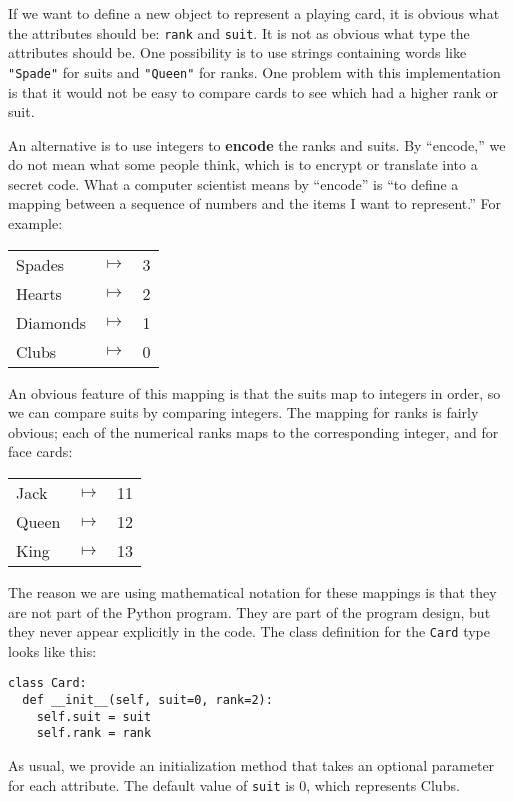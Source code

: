 
If we want to define a new object to represent a playing card, it is
obvious what the attributes should be: {\tt rank} and
{\tt suit}.  It is not as obvious what type the attributes
should be.  One possibility is to use strings containing words like
{\tt "Spade"} for suits and {\tt "Queen"} for ranks.  One problem with
this implementation is that it would not be easy to compare cards to
see which had a higher rank or suit.


An alternative is to use integers to {\bf encode} the ranks and suits.
By ``encode,'' we do not mean what some people think, which is to
encrypt or translate into a secret code.  What a computer scientist
means by ``encode'' is ``to define a mapping between a
sequence of numbers and the items I want to represent.'' For example:

\beforefig
\begin{tabular}{l c l}
Spades & $\mapsto$ & 3 \\
Hearts & $\mapsto$ & 2 \\
Diamonds & $\mapsto$ & 1 \\
Clubs & $\mapsto$ & 0
\end{tabular}
\afterfig

An obvious feature of this mapping is that the suits map to integers in
order, so we can compare suits by comparing integers.  The mapping for
ranks is fairly obvious; each of the numerical ranks maps to the
corresponding integer, and for face cards:

\beforefig
\begin{tabular}{l c l}
Jack & $\mapsto$ & 11 \\
Queen & $\mapsto$ & 12 \\
King & $\mapsto$ & 13 \\
\end{tabular}
\afterfig

The reason we are using mathematical notation for these mappings is
that they are not part of the Python program.  They are part of the
program design, but they never appear explicitly in the code.  The
class definition for the {\tt Card} type looks like this:

\beforeverb
\begin{verbatim}
class Card:
  def __init__(self, suit=0, rank=2):
    self.suit = suit
    self.rank = rank
\end{verbatim}
\afterverb
%
As usual, we provide an initialization method that takes an optional
parameter for each attribute.  The default value of {\tt suit} is
0, which represents Clubs.

